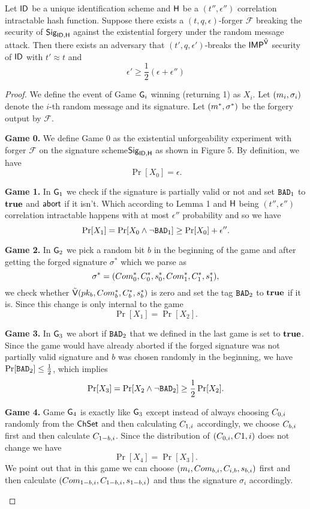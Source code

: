 \begin{theorem}
Let  $\mathsf{ID}$ be a unique identification scheme and $\mathsf{H}$ be a $(t'',\epsilon'')$ correlation intractable hash function. Suppose there exists a $(t,q,\epsilon)$-forger $\mathcal{F}$ breaking the security of $\mathsf{Sig}_{\mathsf{ID},\mathsf{H}}$ against the existential forgery under the random message attack. Then there exists an adversary that $(t',q,\epsilon')$-breaks the $\mathsf{IMP}^{\tilde{\mathsf{V}}}$ security of $\mathsf{ID}$ with $t' \approx t$ and
$$ \epsilon' \geq \frac{1}{2}(\epsilon + \epsilon'')$$
\end{theorem}
\begin{proof}

We define the event of Game $\mathsf{G}_i$ winning (returning 1) as $X_i$. Let $(m_i,\sigma_i)$ denote the $i$-th random message and its signature. Let $(m^*,\sigma^*)$ be the forgery output by $\mathcal{F}$.
\begin{description}[wide,itemindent=\labelsep]
\item [] \textbf{Game 0.} We define Game 0 as the existential unforgeability experiment with forger $\mathcal{F}$ on the signature scheme$\mathsf{Sig}_{\mathsf{ID},\mathsf{H}}$ as shown in Figure 5. By definition, we have
$$\Pr[X_0] = \epsilon.$$
\item [] \textbf{Game 1.} In $\mathsf{G}_1$ we check if the signature is partially valid or not and set $\texttt{BAD}_1$ to $\textbf{true}$ and $\mathsf{abort}$ if it isn't. Which according to Lemma 1 and $\mathsf{H}$ being $(t'',\epsilon'')$ correlation intractable happens with at most $\epsilon''$ probability and so we have 
$$\Pr[X_1] = \Pr[X_0 \land \neg\texttt{BAD}_1]  \geq \Pr[X_0] + \epsilon''.$$

\item [] \textbf{Game 2.} In $\mathsf{G}_2$ we pick a random bit $b$ in the beginning of the game and after getting the forged signature $\sigma^*$ which we parse as 
$$\sigma^* = (Com_0^*,C_0^*,s_0^*, Com_1^*, C_1^*,s_1^*),$$
we check whether $\tilde{\mathsf{V}}(pk_b,Com^*_b,C^*_b,s^*_b)$ is zero and set the tag $\texttt{BAD}_2$ to $\textbf{true}$ if it is. Since this change is only internal to the game 
$$\Pr[X_1] = \Pr[X_2].$$
\item [] \textbf{Game 3.} In $\mathsf{G}_3$ we abort if $\texttt{BAD}_2$ that we defined in the last game is set to $\textbf{true}$. Since the game would have already aborted if the forged signature was not partially valid signature and $b$ was chosen randomly in the beginning, we have
$\Pr[\texttt{BAD}_2] \leq \frac{1}{2}$, which implies
$$\Pr[X_3] = \Pr[X_2 \land \neg \texttt{BAD}_2] \geq \frac{1}{2} \Pr[X_2].$$

\item [] \textbf{Game 4.} 
Game $\mathsf{G}_4$ is exactly like $\mathsf{G}_3$ except instead of always choosing $C_{0,i}$ randomly from the $\mathsf{ChSet}$ and then calculating $C_{1,i}$ accordingly, we choose $C_{b,i}$ first and then calculate 
$C_{1-b,i}$. Since the distribution of $(C_{0,i},C{1,i})$ does not change we have
$$\Pr[X_4] = \Pr[X_3].$$
We point out that in this game we can choose $(m_i, Com_{b,i}, C_{i,b}, s_{b,i})$ first and then calculate 
$(Com_{1-b,i}, C_{1-b,i}, s_{1-b,i})$ and thus the signature $\sigma_i$ accordingly.


\end{description}
\end{proof}

